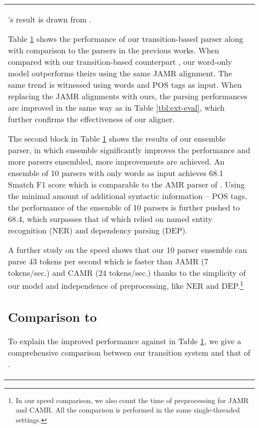 \documentclass[11pt,a4paper]{article}
\begin{document}
\begin{table}[t]
\begin{tabular}{p{}}
\begin{table}[t]
{		\citet{damonte-cohen-satta:2017:EACLlong}'s result
		is drawn from \citet{ballesteros-alonaizan:2017:EMNLP2017}.
	}\label{tbl:exp-result}
\end{table}

Table \ref{tbl:exp-result} shows the performance of our transition-based parser
along with comparison to the parsers in the previous works.
When compared with our transition-based counterpart
\citep{ballesteros-alonaizan:2017:EMNLP2017}, our word-only
model outperforms theirs  using the same JAMR alignment.
The same trend is witnessed using words and POS tags as input.
When replacing the JAMR alignments with ours,
the parsing performances are improved in the same way as in Table \ref{tbl:ext-eval},
which further confirms the effectiveness of our aligner.


The second block in Table \ref{tbl:exp-result} shows the results of our ensemble parser,
in which ensemble significantly improves the performance and more parsers ensembled, more improvements are achieved.
An ensemble of 10 parsers with only words as input
achieves 68.1 Smatch F1 score which is comparable to the 
AMR parser of \citet{wang-xue:2017:EMNLP2017}.
Using the minimal amount of additional syntactic information -- POS tags,
the performance of the ensemble of 10 parsers
is further pushed to 68.4, which surpasses that of \citet{wang-xue:2017:EMNLP2017} 
which relied on named entity recognition (NER) and dependency parsing (DEP).

A further study on the speed shows that our 10 parser ensemble
can parse 43 tokens per second which
is faster than JAMR (7 tokens/sec.) and CAMR (24 tokens/sec.)
thanks to the simplicity of our model and independence of preprocessing,
like NER and DEP.\footnote{In our speed comparison, we also count the time of preprocessing for JAMR and CAMR. 
	All the comparison is performed in the same single-threaded settings.}

\subsection{Comparison to \citet{ballesteros-alonaizan:2017:EMNLP2017}}\label{sec:comp-ba17}

To explain the improved performance against \citet{ballesteros-alonaizan:2017:EMNLP2017} in Table \ref{tbl:exp-result},
we give a comprehensive comparison between
our transition system and that of \citet{ballesteros-alonaizan:2017:EMNLP2017}.


\end{tabular}
\end{table}
\end{document}
